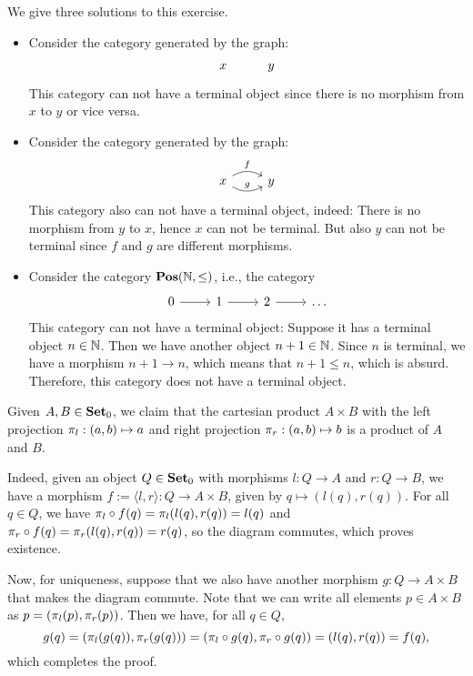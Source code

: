 \begin{solution}\label{sol:cat-without-terminal}
We give three solutions to this exercise.
\begin{itemize}
\item Consider the category generated by the graph: 
\[
\begin{tikzcd}
x & y
\end{tikzcd}
\]
This category can not have a terminal object since there is no morphism from $x$ to $y$ or vice versa.
\item Consider the category generated by the graph: 
\[
\begin{tikzcd}
x \arrow[r, bend left, "f"] \arrow[r, bend right, "g"] & y
\end{tikzcd}
\]
This category also can not have a terminal object, indeed: There is no morphism from $y$ to $x$, hence $x$ can not be terminal. But also $y$ can not be terminal since $f$ and $g$ are different morphisms.
\item Consider the category $ \mathbf{Pos}(\mathbb{N}, \leq) $, i.e., the category
\[
\begin{tikzcd}
	0 \arrow[r] & 1 \arrow[r] & 2 \arrow[r] & \dots
\end{tikzcd}
\]
This category can not have a terminal object: Suppose it has a terminal object $ n \in \mathbb{N} $. Then we have another object $ n + 1 \in \mathbb{N} $. Since $ n $ is terminal, we have a morphism $ n + 1 \to n $, which means that $ n + 1 \leq n $, which is absurd. Therefore, this category does not have a terminal object.
\end{itemize}
\end{solution}

\begin{solution}\label{sol:product_set}
	Given $ A, B \in {\mathbf{Set}}_0 $, we claim that the cartesian product $ A \times B $ with the left projection $ \pi_l: (a, b) \mapsto a $ and right projection $ \pi_r: (a, b) \mapsto b $ is a product of $ A $ and $ B $.

	Indeed, given an object $ Q \in {\mathbf{Set}}_0 $ with morphisms $ l: Q \to A $ and $ r: Q \to B $, we have a morphism $ f := \langle l, r \rangle : Q \to A \times B $, given by $ q \mapsto (l(q), r(q)) $. For all $ q \in Q $, we have $ \pi_l \circ f(q) = \pi_l(l(q), r(q)) = l(q) $ and $ \pi_r \circ f(q) = \pi_r(l(q), r(q)) = r(q) $, so the diagram commutes, which proves existence.

	Now, for uniqueness, suppose that we also have another morphism $ g: Q \to A \times B $ that makes the diagram commute. Note that we can write all elements $ p \in A \times B $ as $ p = (\pi_l(p), \pi_r(p)) $. Then we have, for all $ q \in Q $,
	\[ g(q) = (\pi_l(g(q)), \pi_r(g(q))) = (\pi_l \circ g(q), \pi_r \circ g(q)) = (l(q), r(q)) = f(q), \]
	which completes the proof.
\end{solution}

